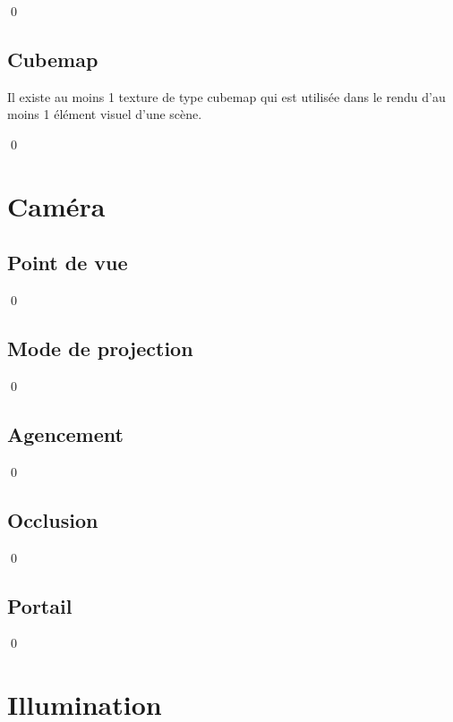 \documentclass[12pt]{article}
\newcommand{\state}{\noindent}
\begin{document}
\qed

\subsection{Cubemap}

\state
Il existe au moins 1 texture de type cubemap qui est utilisée dans le rendu d'au moins 1 élément visuel d'une scène.

\qed

\pagebreak

\section{Caméra}

\subsection{Point de vue}

\state

\qed

\subsection{Mode de projection}

\state

\qed

\subsection{Agencement}

\state

\qed

\subsection{Occlusion}

\state

\qed

\subsection{Portail}

\state

\qed

\pagebreak


\section{Illumination}
\end{document}

